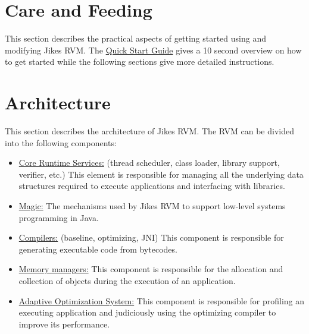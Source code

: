 \documentclass[a4paper]{book}
\begin{document}
\part{Care and Feeding}
\label{part:careandfeeding}

This section describes the practical aspects of getting started using and modifying Jikes RVM. The \hyperref[cha:quickstartguide]{Quick Start Guide} gives a 10 second overview on how to get started while the following sections give more detailed instructions.



























\part{Architecture}
\label{part:architecture}

This section describes the architecture of Jikes RVM. The RVM can be divided into the following components:

\begin{itemize}
  \item \hyperref[cha:coreruntimeservices]{Core Runtime Services:} (thread scheduler, class loader, library support, verifier, etc.) This element is responsible for managing all the underlying data structures required to execute applications and interfacing with libraries.
  \item \hyperref[cha:magic]{Magic:} The mechanisms used by Jikes RVM to support low-level systems programming in Java.
  \item \hyperref[cha:compilers]{Compilers:} (baseline, optimizing, JNI) This component is responsible for generating executable code from bytecodes.
  \item \hyperref[cha:mmtk]{Memory managers:} This component is responsible for the allocation and collection of objects during the execution of an application.
  \item \hyperref[cha:adaptiveoptimizationsystem]{Adaptive Optimization System:} This component is responsible for profiling an executing application and judiciously using the optimizing compiler to improve its performance.
\end{itemize}
\end{document}
